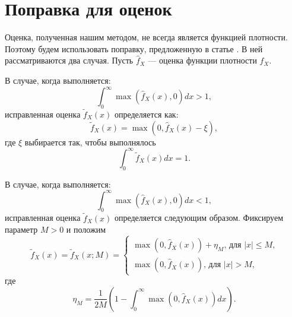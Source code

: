 \documentclass[../paper.tex]{subfiles}
\begin{document}
\section{Поправка для оценок}\label{correction}
Оценка, полученная нашим методом, не всегда является функцией плотности.
Поэтому будем использовать поправку, предложенную в статье \cite{correction-of-density-estimation}.
В ней рассматриваются два случая. Пусть $\hat{f}_X$ --- оценка функции плотности $f_X$.

В случае, когда выполняется:
\[
	\int_0^\infty \max(\hat{f}_X(x), 0) dx > 1
,\]
исправленная оценка $\tilde{f}_X(x)$ определяется как:
\[
	\tilde{f}_X(x) = \max(0, \hat{f}_X(x) - \xi),
\]
где $\xi$ выбирается так, чтобы выполнялось
\[
	\int_0^\infty \tilde{f}_X(x) dx = 1
.\]

В случае, когда выполняется:
\[
	\int_0^\infty \max(\hat{f}_X(x), 0) dx < 1
,\]
исправленная оценка $\tilde{f}_X(x)$ определяется следующим образом. Фиксируем параметр $M > 0$ и положим
\[
	\tilde{f}_X(x)
	= \tilde{f}_X(x; M) =
	\begin{cases}
		\max(0, \hat{f}_X(x)) + \eta_M \text{, для $|x| \leqslant M$,} \\
		\max(0, \hat{f}_X(x)) \text{, для $|x| > M$,}
	\end{cases}
\]
где
\[
  \eta_M = \frac{1}{2M} \left( 1 - \int_0^\infty \max(0, \hat{f}_X(x)) dx \right)
.\]
\end{document}
